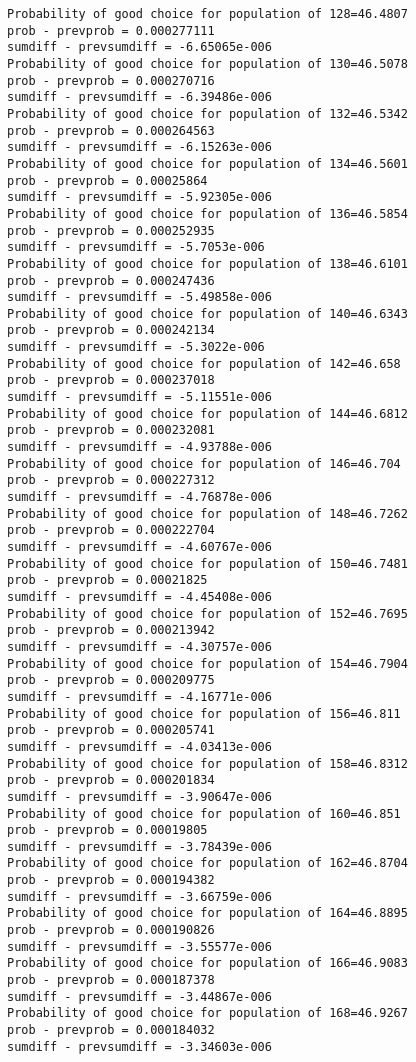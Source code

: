 \documentclass[11pt,onecolumn]{article}
\begin{document}
\begin{verbatim}
Probability of good choice for population of 128=46.4807
prob - prevprob = 0.000277111
sumdiff - prevsumdiff = -6.65065e-006
Probability of good choice for population of 130=46.5078
prob - prevprob = 0.000270716
sumdiff - prevsumdiff = -6.39486e-006
Probability of good choice for population of 132=46.5342
prob - prevprob = 0.000264563
sumdiff - prevsumdiff = -6.15263e-006
Probability of good choice for population of 134=46.5601
prob - prevprob = 0.00025864
sumdiff - prevsumdiff = -5.92305e-006
Probability of good choice for population of 136=46.5854
prob - prevprob = 0.000252935
sumdiff - prevsumdiff = -5.7053e-006
Probability of good choice for population of 138=46.6101
prob - prevprob = 0.000247436
sumdiff - prevsumdiff = -5.49858e-006
Probability of good choice for population of 140=46.6343
prob - prevprob = 0.000242134
sumdiff - prevsumdiff = -5.3022e-006
Probability of good choice for population of 142=46.658
prob - prevprob = 0.000237018
sumdiff - prevsumdiff = -5.11551e-006
Probability of good choice for population of 144=46.6812
prob - prevprob = 0.000232081
sumdiff - prevsumdiff = -4.93788e-006
Probability of good choice for population of 146=46.704
prob - prevprob = 0.000227312
sumdiff - prevsumdiff = -4.76878e-006
Probability of good choice for population of 148=46.7262
prob - prevprob = 0.000222704
sumdiff - prevsumdiff = -4.60767e-006
Probability of good choice for population of 150=46.7481
prob - prevprob = 0.00021825
sumdiff - prevsumdiff = -4.45408e-006
Probability of good choice for population of 152=46.7695
prob - prevprob = 0.000213942
sumdiff - prevsumdiff = -4.30757e-006
Probability of good choice for population of 154=46.7904
prob - prevprob = 0.000209775
sumdiff - prevsumdiff = -4.16771e-006
Probability of good choice for population of 156=46.811
prob - prevprob = 0.000205741
sumdiff - prevsumdiff = -4.03413e-006
Probability of good choice for population of 158=46.8312
prob - prevprob = 0.000201834
sumdiff - prevsumdiff = -3.90647e-006
Probability of good choice for population of 160=46.851
prob - prevprob = 0.00019805
sumdiff - prevsumdiff = -3.78439e-006
Probability of good choice for population of 162=46.8704
prob - prevprob = 0.000194382
sumdiff - prevsumdiff = -3.66759e-006
Probability of good choice for population of 164=46.8895
prob - prevprob = 0.000190826
sumdiff - prevsumdiff = -3.55577e-006
Probability of good choice for population of 166=46.9083
prob - prevprob = 0.000187378
sumdiff - prevsumdiff = -3.44867e-006
Probability of good choice for population of 168=46.9267
prob - prevprob = 0.000184032
sumdiff - prevsumdiff = -3.34603e-006

\end{verbatim}
\end{document}
